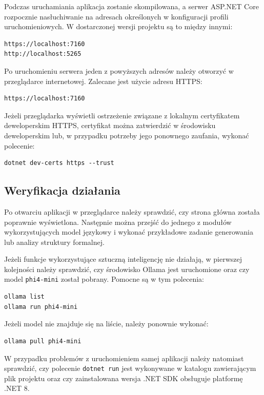 \documentclass[12pt]{article}
\begin{document}
Podczas uruchamiania aplikacja zostanie skompilowana, a serwer ASP.NET Core rozpocznie nasłuchiwanie na adresach określonych w konfiguracji profili uruchomieniowych. W dostarczonej wersji projektu są to między innymi:

\begin{verbatim}
https://localhost:7160
http://localhost:5265
\end{verbatim}

Po uruchomieniu serwera jeden z powyższych adresów należy otworzyć w przeglądarce internetowej. Zalecane jest użycie adresu HTTPS:

\begin{verbatim}
https://localhost:7160
\end{verbatim}

Jeżeli przeglądarka wyświetli ostrzeżenie związane z lokalnym certyfikatem deweloperskim HTTPS, certyfikat można zatwierdzić w środowisku deweloperskim lub, w przypadku potrzeby jego ponownego zaufania, wykonać polecenie:

\begin{verbatim}
dotnet dev-certs https --trust
\end{verbatim}

\subsection{Weryfikacja działania}

Po otwarciu aplikacji w przeglądarce należy sprawdzić, czy strona główna została poprawnie wyświetlona. Następnie można przejść do jednego z modułów wykorzystujących model językowy i wykonać przykładowe zadanie generowania lub analizy struktury formalnej.

Jeżeli funkcje wykorzystujące sztuczną inteligencję nie działają, w pierwszej kolejności należy sprawdzić, czy środowisko Ollama jest uruchomione oraz czy model \texttt{phi4-mini} został pobrany. Pomocne są w tym polecenia:

\begin{verbatim}
ollama list
ollama run phi4-mini
\end{verbatim}

Jeżeli model nie znajduje się na liście, należy ponownie wykonać:

\begin{verbatim}
ollama pull phi4-mini
\end{verbatim}

W przypadku problemów z uruchomieniem samej aplikacji należy natomiast sprawdzić, czy polecenie \texttt{dotnet run} jest wykonywane w katalogu zawierającym plik projektu oraz czy zainstalowana wersja .NET SDK obsługuje platformę .NET 8.
\end{document}
